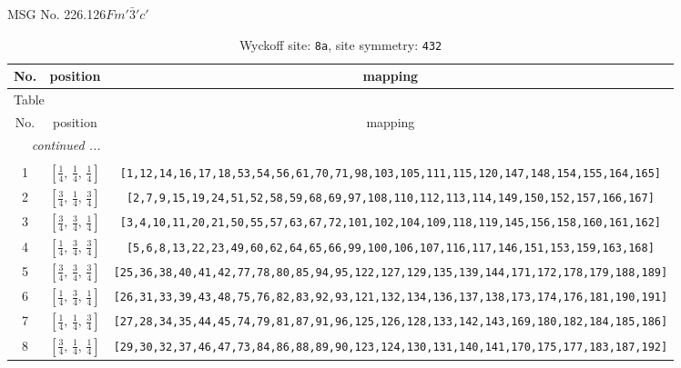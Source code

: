 \documentclass[fleqn,8pt]{jsarticle}
\begin{document}
\setcounter{MaxMatrixCols}{32}

\renewcommand{\tablename}{Table~}
\renewcommand{\figurename}{Figure~}
\begin{center}
\LARGE
MSG No. 226.126\quad$Fm'\bar{3}'c'$
\end{center}
\renewcommand{\arraystretch}{1.2}
\begin{longtable}{ccc}
\caption{Wyckoff site: {\tt 8a}, site symmetry: {\tt 432}}
 \\
 \hline \hline
No. & position & mapping \\ \hline \endfirsthead

\multicolumn{2}{l}{\tablename\ \thetable{}} \\
 \hline \hline
No. & position & mapping \\ \hline \endhead

 \hline \hline
\multicolumn{2}{r}{\footnotesize\it continued ...} \\ \endfoot

 \hline \hline
\multicolumn{2}{r}{} \\ \endlastfoot

1 & $\left[ \frac{1}{4},\, \frac{1}{4},\, \frac{1}{4} \right]$ & {\tt [1,12,14,16,17,18,53,54,56,61,70,71,98,103,105,111,115,120,147,148,154,155,164,165]} \\ \hline
2 & $\left[ \frac{3}{4},\, \frac{1}{4},\, \frac{3}{4} \right]$ & {\tt [2,7,9,15,19,24,51,52,58,59,68,69,97,108,110,112,113,114,149,150,152,157,166,167]} \\ \hline
3 & $\left[ \frac{3}{4},\, \frac{3}{4},\, \frac{1}{4} \right]$ & {\tt [3,4,10,11,20,21,50,55,57,63,67,72,101,102,104,109,118,119,145,156,158,160,161,162]} \\ \hline
4 & $\left[ \frac{1}{4},\, \frac{3}{4},\, \frac{3}{4} \right]$ & {\tt [5,6,8,13,22,23,49,60,62,64,65,66,99,100,106,107,116,117,146,151,153,159,163,168]} \\ \hline
5 & $\left[ \frac{3}{4},\, \frac{3}{4},\, \frac{3}{4} \right]$ & {\tt [25,36,38,40,41,42,77,78,80,85,94,95,122,127,129,135,139,144,171,172,178,179,188,189]} \\ \hline
6 & $\left[ \frac{1}{4},\, \frac{3}{4},\, \frac{1}{4} \right]$ & {\tt [26,31,33,39,43,48,75,76,82,83,92,93,121,132,134,136,137,138,173,174,176,181,190,191]} \\ \hline
7 & $\left[ \frac{1}{4},\, \frac{1}{4},\, \frac{3}{4} \right]$ & {\tt [27,28,34,35,44,45,74,79,81,87,91,96,125,126,128,133,142,143,169,180,182,184,185,186]} \\ \hline
8 & $\left[ \frac{3}{4},\, \frac{1}{4},\, \frac{1}{4} \right]$ & {\tt [29,30,32,37,46,47,73,84,86,88,89,90,123,124,130,131,140,141,170,175,177,183,187,192]} \\
\end{longtable}
\end{document}
